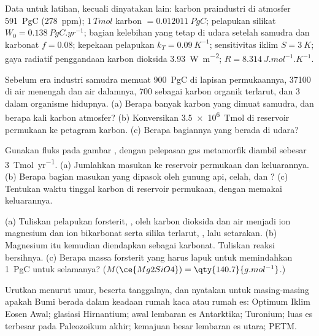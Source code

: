 Data untuk latihan, kecuali dinyatakan lain: karbon praindustri di atmosfer
\qty{591}{PgC} (\qty{278}{ppm}); $\qty{1}{Tmol}$ karbon $= \qty{0.012011}{PgC}$; pelapukan
silikat $W_0 = \qty{0.138}{PgC.yr^{-1}}$; bagian kelebihan yang tetap di udara setelah samudra dan
karbonat $f = 0.08$; kepekaan pelapukan $k_T = \qty{0.09}{K^{-1}}$; sensitivitas iklim $S =
\qty{3}{K}$; gaya radiatif penggandaan karbon dioksida \qty{3.93}{W.m^{-2}}; $R =
\qty{8.314}{J.mol^{-1}.K^{-1}}$.

\begin{exercise}[$\star$]\label{exo:b2:deep-time-climate:1}
Sebelum era industri samudra memuat \qty{900}{PgC} di lapisan permukaannya, \num{37100} di air
menengah dan air dalamnya, 700 sebagai karbon organik terlarut, dan 3 dalam organisme hidupnya.
(a) Berapa banyak karbon yang dimuat samudra, dan berapa kali karbon atmosfer? (b) Konversikan
\qty{3.5e6}{Tmol} di reservoir permukaan ke petagram karbon. (c) Berapa bagiannya yang berada di
udara?
\end{exercise}

\begin{exercise}[$\star$]\label{exo:b2:deep-time-climate:2}
Gunakan fluks pada gambar , dengan pelepasan gas metamorfik diambil sebesar
\qty{3}{Tmol.yr^{-1}}. (a) Jumlahkan masukan ke reservoir permukaan dan keluarannya.
(b) Berapa bagian masukan yang dipasok oleh gunung api, celah, dan ? (c) Tentukan waktu
tinggal karbon di reservoir permukaan, dengan memakai keluarannya.
\end{exercise}

\begin{exercise}[$\star$]\label{exo:b2:deep-time-climate:3}
(a) Tuliskan pelapukan forsterit, , oleh karbon dioksida dan air menjadi ion magnesium
dan ion bikarbonat serta silika terlarut, , lalu setarakan. (b) Magnesium itu kemudian
diendapkan sebagai karbonat. Tuliskan reaksi bersihnya. (c) Berapa massa forsterit yang harus lapuk untuk
memindahkan \qty{1}{PgC} untuk selamanya? ($M(\ce{Mg2SiO4}) = \qty{140.7}{g.mol^{-1}}$.)
\end{exercise}

\begin{exercise}[$\star$]\label{exo:b2:deep-time-climate:4}
Urutkan menurut umur, beserta tanggalnya, dan nyatakan untuk masing-masing apakah Bumi berada dalam keadaan rumah kaca atau
rumah es: Optimum Iklim Eosen Awal; glasiasi Hirnantium; awal lembaran es
Antarktika; Turonium; luas es terbesar pada Paleozoikum akhir; kemajuan besar
lembaran es utara; PETM.
\end{exercise}

